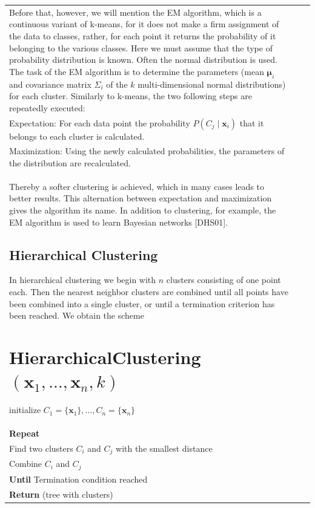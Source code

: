 \documentclass[10pt]{book}
\begin{document}
\begin{center}
\begin{tabular}{|l|l|l|}
Before that, however, we will mention the EM algorithm, which is a continuous variant of k-means, for it does not make a firm assignment of the data to classes, rather, for each point it returns the probability of it belonging to the various classes. Here we must assume that the type of probability distribution is known. Often the normal distribution is used. The task of the EM algorithm is to determine the parameters (mean $\boldsymbol{\mu}_{i}$ and covariance matrix $\Sigma_{i}$ of the $k$ multi-dimensional normal distributions) for each cluster. Similarly to k-means, the two following steps are repeatedly executed:\\
Expectation: For each data point the probability $P\left(C_{j} \mid \boldsymbol{x}_{i}\right)$ that it belongs to each cluster is calculated.\\
Maximization: Using the newly calculated probabilities, the parameters of the distribution are recalculated.\\[0pt]
Thereby a softer clustering is achieved, which in many cases leads to better results. This alternation between expectation and maximization gives the algorithm its name. In addition to clustering, for example, the EM algorithm is used to learn Bayesian networks [DHS01].

\subsection{Hierarchical Clustering}
In hierarchical clustering we begin with $n$ clusters consisting of one point each. Then the nearest neighbor clusters are combined until all points have been combined into a single cluster, or until a termination criterion has been reached. We obtain the scheme

\section{HierarchicalClustering $\left(\boldsymbol{x}_{1}, \ldots, \boldsymbol{x}_{n}, k\right)$}
initialize $C_{1}=\{\boldsymbol{x}_{1}\}, \ldots, C_{n}=\{\boldsymbol{x}_{n}\}$\\
\textbf{Repeat}\\
Find two clusters $C_{i}$ and $C_{j}$ with the smallest distance\\
Combine $C_{i}$ and $C_{j}$\\
\textbf{Until} Termination condition reached\\
\textbf{Return} (tree with clusters)


\end{tabular}
\end{center}
\end{document}

